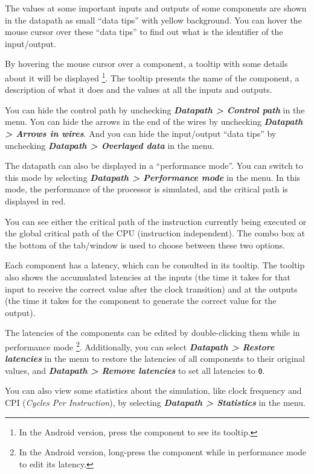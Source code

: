 \documentclass[11pt,a4paper,twoside,titlepage]{article}
\newcommand{\menupath}[1]{\textbf{\emph{#1}}}
\begin{document}
The values at some important inputs and outputs of some components are
shown in the datapath as small ``data tips'' with yellow background.
You can hover the mouse cursor over these ``data tips'' to find out what
is the identifier of the input/output.

By hovering the mouse cursor over a component, a tooltip with some details
about it will be displayed \footnote{In the Android version, press the 
component to see its tooltip.}.
The tooltip presents the name of the component, a description of what it
does and the values at all the inputs and outputs.

You can hide the control path by unchecking 
\menupath{Datapath > Control path} in the menu.
You can hide the arrows in the end of the wires by unchecking
\menupath{Datapath > Arrows in wires}.
And you can hide the input/output ``data tips'' by unchecking
\menupath{Datapath > Overlayed data} in the menu.

\bigskip

The datapath can also be displayed in a ``performance mode''. You can
switch to this mode by selecting \menupath{Datapath > Performance mode}
in the menu.
In this mode, the performance of the processor is simulated, and the
critical path is displayed in red.

You can see either the critical path of the instruction currently being
executed or the global critical path of the CPU (instruction independent).
The combo box at the bottom of the tab/window is used to choose between
these two options.

Each component has a latency, which can be consulted in its tooltip.
The tooltip also shows the accumulated latencies at the inputs (the time it
takes for that input to receive the correct value after the clock transition)
and at the outputs (the time it takes for the component to generate the
correct value for the output).

The latencies of the components can be edited by double-clicking them while
in performance mode \footnote{In the Android version, long-press the 
component while in performance mode to edit its latency.}.
Additionally, you can select \menupath{Datapath > Restore latencies} in the
menu to restore the latencies of all components to their original values,
and \menupath{Datapath > Remove latencies} to set all latencies to \verb+0+.

You can also view some statistics about the simulation, like clock frequency
and CPI (\emph{Cycles Per Instruction}), by selecting 
\menupath{Datapath > Statistics} in the menu.
\end{document}
